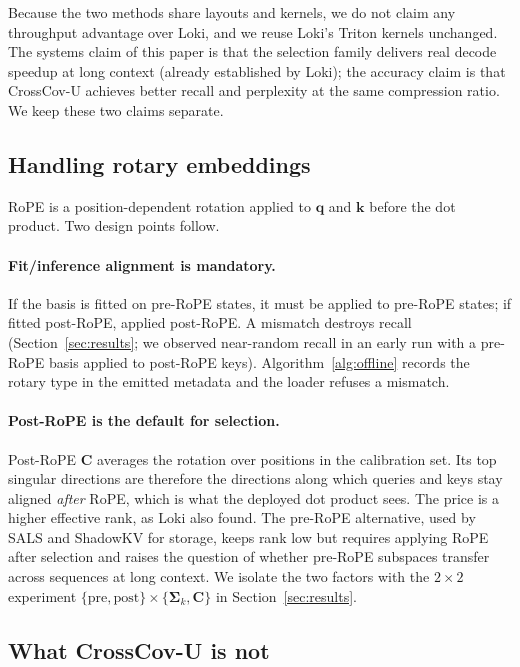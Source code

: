 \documentclass[10pt]{article}
\newcommand{\bq}{\mathbf{q}}
\newcommand{\bk}{\mathbf{k}}
\newcommand{\bC}{\mathbf{C}}
\newcommand{\Sk}{\bm{\Sigma}_k}
\newcommand{\method}{CrossCov-U}
\theoremstyle{plain}
\theoremstyle{definition}
\theoremstyle{remark}
\begin{document}
Because the two methods share layouts and kernels, we do not claim any
throughput advantage over Loki, and we reuse Loki's Triton kernels unchanged.
The systems claim of this paper is that the selection family delivers real
decode speedup at long context (already established by Loki); the accuracy
claim is that \method{} achieves better recall and perplexity at the same
compression ratio. We keep these two claims separate.

\subsection{Handling rotary embeddings}
\label{sec:rope}

RoPE is a position-dependent rotation applied to $\bq$ and $\bk$ before the
dot product. Two design points follow.

\paragraph{Fit/inference alignment is mandatory.}
If the basis is fitted on pre-RoPE states, it must be applied to pre-RoPE
states; if fitted post-RoPE, applied post-RoPE. A mismatch destroys recall
(Section~\ref{sec:results}; we observed near-random recall in an early run
with a pre-RoPE basis applied to post-RoPE keys). Algorithm~\ref{alg:offline}
records the rotary type in the emitted metadata and the loader refuses a
mismatch.

\paragraph{Post-RoPE is the default for selection.}
Post-RoPE $\bC$ averages the rotation over positions in the calibration set.
Its top singular directions are therefore the directions along which
queries and keys stay aligned \emph{after} RoPE, which is what the deployed
dot product sees. The price is a higher effective rank, as Loki also found.
The pre-RoPE alternative, used by SALS and ShadowKV for storage, keeps rank
low but requires applying RoPE after selection and raises the question of
whether pre-RoPE subspaces transfer across sequences at long context. We
isolate the two factors with the $2\times2$ experiment
$\{\text{pre},\text{post}\}\times\{\Sk,\bC\}$ in Section~\ref{sec:results}.

\subsection{What \method{} is not}
\label{sec:notcompress}
\end{document}
